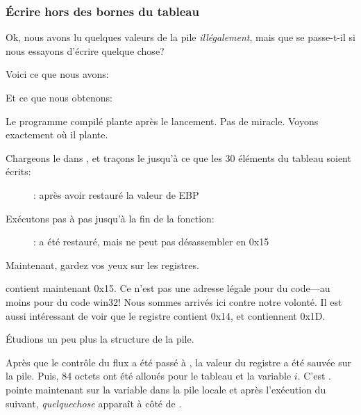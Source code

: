 \subsubsection{Écrire hors des bornes du tableau}

Ok, nous avons lu quelques valeurs de la pile \emph{illégalement}, mais que se passe-t-il
si nous essayons d'écrire quelque chose?

Voici ce que nous avons:




Et ce que nous obtenons:



Le programme compilé plante après le lancement. Pas de miracle. Voyons exactement
où il plante.

\clearpage
\myindex{\olly}

Chargeons le dans \olly, et traçons le jusqu'à ce que les 30 éléments du tableau
soient écrits:

\begin{figure}[H]
\centering
{}
\caption{\olly: après avoir restauré la valeur de EBP}
\label{fig:array_BO_olly_w1}
\end{figure}

\clearpage
Exécutons pas à pas jusqu'à la fin de la fonction:

\begin{figure}[H]
\centering
{}
\caption{\olly: 
 a été restauré, mais \olly ne peut pas désassembler en 0x15}
\label{fig:array_BO_olly_w2}
\end{figure}

Maintenant, gardez vos yeux sur les registres.

\EIP contient maintenant 0x15. Ce n'est pas une adresse légale pour du code---au
moins pour du code win32!
Nous sommes arrivés ici contre notre volonté.
Il est aussi intéressant de voir que le registre \EBP contient 0x14, \ECX et \EDX
contiennent 0x1D.

Étudions un peu plus la structure de la pile.

Après que le contrôle du flux a été passé à \TT{\main}, la valeur du registre \EBP
a été sauvée sur la pile.
Puis, 84 octets ont été alloués pour le tableau et la variable $i$.
C'est .
\ESP pointe maintenant sur la variable  dans la pile locale et après l'exécution
du  suivant, \emph{quelquechose} apparaît à côté de .

